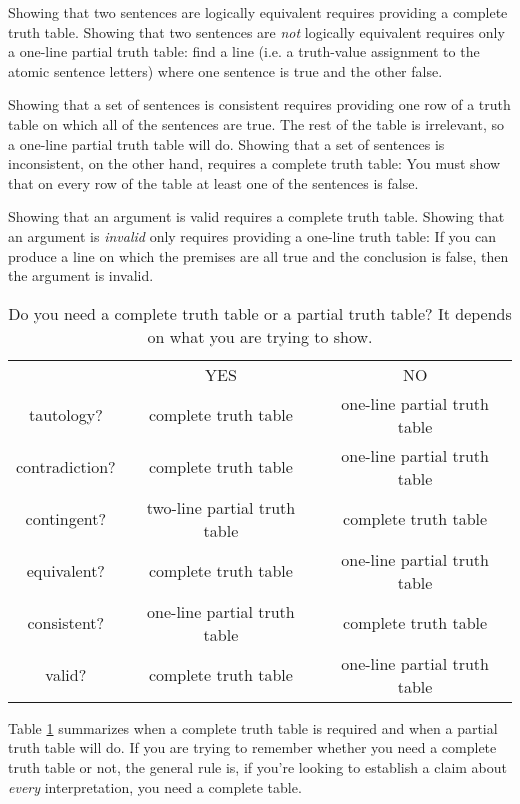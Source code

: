 Showing that two sentences are logically equivalent requires providing a complete truth table. Showing that two sentences are \emph{not} logically equivalent requires only a one-line partial truth table: find a line (i.e. a truth-value assignment to the atomic sentence letters) where one sentence is true and the other false.

Showing that a set of sentences is consistent requires providing one row of a truth table on which all of the sentences are true. The rest of the table is irrelevant, so a one-line partial truth table will do. Showing that a set of sentences is inconsistent, on the other hand, requires a complete truth table: You must show that on every row of the table at least one of the sentences is false.

Showing that an argument is valid requires a complete truth table. Showing that an argument is \emph{invalid} only requires providing a one-line truth table: If you can produce a line on which the premises are all true and the conclusion is false, then the argument is invalid.

\begin{table}
\begin{center}
\begin{tabular}{c|c|c|}
\cline{2-3}
 & YES & NO\\
\cline{2-3}
tautology? & complete truth table & one-line partial truth table\\
contradiction? &  complete truth table  & one-line partial truth table\\
contingent? & two-line partial truth table & complete truth table\\
equivalent? & complete truth table & one-line partial truth table\\
consistent? & one-line partial truth table & complete truth table\\
valid? & complete truth table & one-line partial truth table\\
\cline{2-3}
\end{tabular}
\end{center}
\caption{Do you need a complete truth table or a partial truth table? It depends on what you are trying to show.}
\label{table.CompleteVsPartial}
\end{table}

Table \ref{table.CompleteVsPartial} summarizes when a complete truth table is required and when a partial truth table will do. If you are trying to remember whether you need a complete truth table or not, the general rule is, if you're looking to establish a claim about \emph{every} interpretation, you need a complete table.

